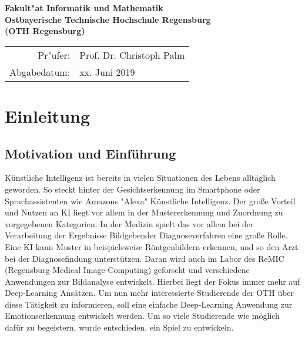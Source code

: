 \documentclass[12pt,a4paper,headinclude,twoside, plainheadsepline, open=right,numbers=noenddot]{scrreprt}
\begin{document}
\begin{titlepage}
\begin{center}
\vfill
\vfill
\textbf{\large Fakult"at Informatik und Mathematik\\
Ostbayerische Technische Hochschule Regensburg\\
(OTH Regensburg)}
\vfill
\vfill

\begin{tabular}{rl}
Pr"ufer:   & Prof. Dr. Christoph Palm\\
Abgabedatum:& xx. Juni 2019
\end{tabular}
\end{center}
\end{titlepage}


\pagestyle{useheadings} %
\tableofcontents %


\chapter{Einleitung}
\label{einleitung}

\section{Motivation und Einführung}
Künstliche Intelligenz ist bereits in vielen Situationen des Lebens alltäglich geworden. So steckt hinter der Gesichtserkennung im Smartphone oder Sprachassistenten wie Amazons "{}Alexa"{} Künstliche Intelligenz. Der große Vorteil und Nutzen an KI liegt vor allem in der Mustererkennung und Zuordnung zu vorgegebenen Kategorien. In der Medizin spielt das vor allem bei der Verarbeitung der Ergebnisse Bildgebender Diagnoseverfahren eine große Rolle. Eine KI kann Muster in beispielsweise Röntgenbildern erkennen, und so den Arzt bei der Diagnosefindung unterstützen.
Daran wird auch im Labor des ReMIC (Regensburg Medical Image Computing) geforscht und verschiedene Anwendungen zur Bildanalyse entwickelt. Hierbei liegt der Fokus immer mehr auf Deep-Learning Ansätzen. Um nun mehr interessierte Studierende der OTH über diese Tätigkeit zu informieren, soll eine einfache Deep-Learning Anwendung zur Emotionserkennung entwickelt werden. Um so viele Studierende wie möglich dafür zu begeistern, wurde entschieden, ein Spiel zu entwickeln. 
\end{document}
